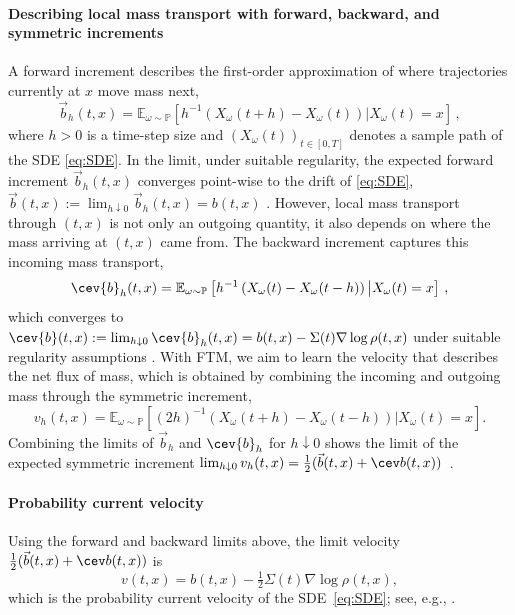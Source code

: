 \documentclass[oneside,11pt]{article}
\theoremstyle{remark}
\begin{document}
\paragraph{Describing local mass transport with forward, backward, and  symmetric increments}
A forward increment describes the first-order approximation of where trajectories currently at $x$ move mass next, 
\begin{equation}\label{eq:MeanFwdDrift}
\vec{b}_h(t, x) = \mathbb{E}_{\omega \sim \mathbb{P}}\left[h^{-1}\left({X_{\omega}(t + h) - X_{\omega}(t)}\right) \big| X_{\omega}(t) = x\right]\,,
\end{equation}
where $h > 0$ is a time-step size and $(X_{\omega}(t))_{t \in [0, T]}$ denotes a sample path of the SDE \eqref{eq:SDE}. In the limit, under suitable regularity, the expected forward increment $\vec{b}_h(t, x)$ converges point-wise to the drift of \eqref{eq:SDE}, $\vec{b}(t,x):=
\lim_{h \downarrow 0} \vec{b}_h(t, x) = b(t, x)$ \cite{kloeden-platen:1992}. However, local mass transport through $(t,x)$ is not only an outgoing quantity, it also depends on where the mass arriving at $(t, x)$ came from. The backward increment captures this incoming mass transport, \begin{equation}\label{eq:MeanBwdDrift}
\cev{b}_h(t, x) = \mathbb{E}_{\omega \sim \mathbb{P}}\left[h^{-1}\left({X_{\omega}(t) - X_{\omega}(t - h)}\right) \big| X_{\omega}(t) = x\right]\,,
\end{equation}
which converges to $\cev{b}(t,x):=\lim_{h \downarrow 0} \cev{b}_h(t, x) = b(t, x) - \Sigma(t)\nabla \log \rho(t, x)$ 
under suitable regularity assumptions \cite{nelson:1967,anderson:1982,haussmann-pardoux:1986}. With FTM, we aim to learn the velocity that describes the net flux of mass, which is obtained by combining the incoming and outgoing mass through the symmetric increment,
\begin{equation}\label{eq:SymIncrement}
v_h(t, x) = \mathbb{E}_{\omega \sim \mathbb{P}}\left[(2h)^{-1}\left(X_{\omega}(t + h) - X_{\omega}(t - h)\right) \big| X_{\omega}(t) = x\right].
\end{equation}
Combining the limits of $\vec{b}_h$ and $\cev{b}_h$ for $h \downarrow 0$ shows the limit of the expected symmetric increment $\lim_{h \downarrow 0} v_h(t, x) = \frac{1}{2}(\vec b(t,x)+\cev b(t,x))$~\cite{nelson:1967}.

 

\paragraph{Probability current velocity}
Using the forward and backward limits above, the limit velocity $\tfrac{1}{2}(\vec b(t,x)+\cev b(t,x))$ is
\begin{equation}\label{eq:CurrentVelocity}
    v(t,x)
    =
    b(t,x)
    -
    \tfrac{1}{2}\Sigma(t)\nabla \log \rho(t,x),
\end{equation}
which is the probability current velocity of the SDE~\eqref{eq:SDE}; see, e.g.,  \cite[Chapter~4]{pavliotis:2014}.
\end{document}
